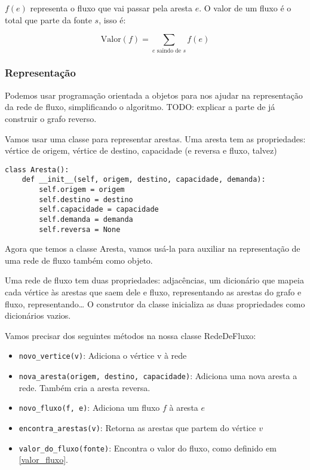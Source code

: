 \documentclass[11pt]{article}
\begin{document}
$f(e)$ representa o fluxo que vai passar pela aresta $e$. O valor de
um fluxo é o total que parte da fonte $s$, isso é:

$$\label{valor_fluxo} \mathrm{Valor}(f) = \sum_{e \text{ saindo de } s} f(e) $$

\subsubsection{Representação}
\label{sec-3-1-2}

Podemos usar programação orientada a objetos para nos ajudar na
representação da rede de fluxo, simplificando o algoritmo.
TODO: explicar a parte de já construir o grafo reverso.

Vamos usar uma classe para representar arestas. Uma aresta tem as
propriedades: vértice de origem, vértice de destino, capacidade
(e reversa e fluxo, talvez)

\begin{verbatim}
class Aresta():
    def __init__(self, origem, destino, capacidade, demanda):
        self.origem = origem
        self.destino = destino
        self.capacidade = capacidade
        self.demanda = demanda
        self.reversa = None
\end{verbatim}

Agora que temos a classe Aresta, vamos usá-la para auxiliar na
representação de uma rede de fluxo também como objeto.

Uma rede de fluxo tem duas propriedades: adjacências, um dicionário
que mapeia cada vértice às arestas que saem dele e fluxo,
representando as arestas do grafo e fluxo, representando\ldots{}
O construtor da classe inicializa as duas propriedades como dicionários vazios.

Vamos precisar dos seguintes métodos na nossa classe RedeDeFluxo:

\begin{itemize}
\item \verb~novo_vertice(v)~: Adiciona o vértice v à rede
\item \verb~nova_aresta(origem, destino, capacidade)~: Adiciona uma nova aresta a
rede. Também cria a aresta reversa.
\item \verb~novo_fluxo(f, e)~: Adiciona um fluxo $f$ à aresta $e$
\item \verb~encontra_arestas(v)~: Retorna as arestas que partem do vértice $v$
\item \verb~valor_do_fluxo(fonte)~: Encontra o valor do fluxo, como definido em \eqref{valor_fluxo}.
\end{itemize}
\end{document}
